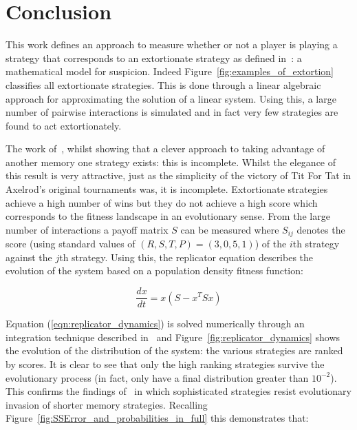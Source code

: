 \documentclass[a4paper]{article}
\begin{document}
\section{Conclusion}\label{sec:conclusion}

This work defines an approach to measure whether or not a player is playing a
strategy that corresponds to an extortionate strategy as defined
in~\cite{Press2012}: a mathematical model for suspicion. Indeed
Figure~\ref{fig:examples_of_extortion} classifies all extortionate strategies.
This is done through a linear algebraic approach for approximating the solution
of a linear system. Using this, a large number of pairwise interactions is
simulated and in fact very few strategies are found to act extortionately.

The work of~\cite{Press2012}, whilst showing that a clever approach to taking
advantage of another memory one strategy exists: this is incomplete. Whilst the
elegance of this result is very attractive, just as the simplicity of the
victory of Tit For Tat in Axelrod's original tournaments was, it is incomplete.
Extortionate strategies achieve a high number of wins but they do not
achieve a high score which corresponds to the fitness landscape in an
evolutionary sense. From the large number of interactions a payoff matrix \(S\)
can be measured where \(S_{ij}\) denotes the score (using standard values of
\((R, S, T, P) = (3, 0, 5, 1)\)) of the \(i\)th strategy
against the \(j\)th strategy. Using this, the replicator equation
describes the evolution of the system based on a population density fitness
function:

\begin{equation}\label{eqn:replicator_dynamics}
    \frac{dx}{dt} = x(S-x^TS x)
\end{equation}

Equation (\ref{eqn:replicator_dynamics}) is solved numerically through an
integration technique described in~\cite{Petzold1983} and
Figure~\ref{fig:replicator_dynamics} shows the evolution of the distribution of
the system: the various strategies are ranked by scores. It is clear to see that
only the high ranking strategies survive the evolutionary process (in fact,
only 
have a final distribution greater than \(10 ^ {-2}\)). This confirms the
findings of~\cite{Moran1707} in which sophisticated strategies resist
evolutionary invasion of shorter memory strategies. Recalling
Figure~\ref{fig:SSError_and_probabilities_in_full} this demonstrates that:
\end{document}
